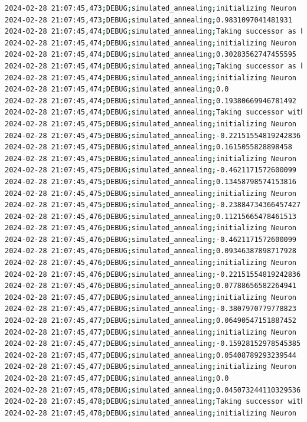 \documentclass{article}
\begin{document}
\begin{lstlisting}[language=bash, caption=Example Output of Program]
2024-02-28 21:07:45,473;DEBUG;simulated_annealing;initializing Neuron
2024-02-28 21:07:45,473;DEBUG;simulated_annealing;0.9831097041481931
2024-02-28 21:07:45,474;DEBUG;simulated_annealing;Taking successor as better option (exploitation)
2024-02-28 21:07:45,474;DEBUG;simulated_annealing;initializing Neuron
2024-02-28 21:07:45,474;DEBUG;simulated_annealing;0.30283562747455595
2024-02-28 21:07:45,474;DEBUG;simulated_annealing;Taking successor as better option (exploitation)
2024-02-28 21:07:45,474;DEBUG;simulated_annealing;initializing Neuron
2024-02-28 21:07:45,474;DEBUG;simulated_annealing;0.0
2024-02-28 21:07:45,474;DEBUG;simulated_annealing;0.19380669946781492
2024-02-28 21:07:45,474;DEBUG;simulated_annealing;Taking successor with probability 100% (exploration)
2024-02-28 21:07:45,475;DEBUG;simulated_annealing;initializing Neuron
2024-02-28 21:07:45,475;DEBUG;simulated_annealing;-0.22151554819242836
2024-02-28 21:07:45,475;DEBUG;simulated_annealing;0.1615055828898458
2024-02-28 21:07:45,475;DEBUG;simulated_annealing;initializing Neuron
2024-02-28 21:07:45,475;DEBUG;simulated_annealing;-0.4621171572600099
2024-02-28 21:07:45,475;DEBUG;simulated_annealing;0.13458798574153816
2024-02-28 21:07:45,475;DEBUG;simulated_annealing;initializing Neuron
2024-02-28 21:07:45,475;DEBUG;simulated_annealing;-0.23884734366457427
2024-02-28 21:07:45,476;DEBUG;simulated_annealing;0.11215665478461513
2024-02-28 21:07:45,476;DEBUG;simulated_annealing;initializing Neuron
2024-02-28 21:07:45,476;DEBUG;simulated_annealing;-0.4621171572600099
2024-02-28 21:07:45,476;DEBUG;simulated_annealing;0.09346387898717928
2024-02-28 21:07:45,476;DEBUG;simulated_annealing;initializing Neuron
2024-02-28 21:07:45,476;DEBUG;simulated_annealing;-0.22151554819242836
2024-02-28 21:07:45,476;DEBUG;simulated_annealing;0.07788656582264941
2024-02-28 21:07:45,477;DEBUG;simulated_annealing;initializing Neuron
2024-02-28 21:07:45,477;DEBUG;simulated_annealing;-0.3807970779778823
2024-02-28 21:07:45,477;DEBUG;simulated_annealing;0.06490547151887452
2024-02-28 21:07:45,477;DEBUG;simulated_annealing;initializing Neuron
2024-02-28 21:07:45,477;DEBUG;simulated_annealing;-0.15928152978545385
2024-02-28 21:07:45,477;DEBUG;simulated_annealing;0.05408789293239544
2024-02-28 21:07:45,477;DEBUG;simulated_annealing;initializing Neuron
2024-02-28 21:07:45,477;DEBUG;simulated_annealing;0.0
2024-02-28 21:07:45,478;DEBUG;simulated_annealing;0.045073244110329536
2024-02-28 21:07:45,478;DEBUG;simulated_annealing;Taking successor with probability 100% (exploration)
2024-02-28 21:07:45,478;DEBUG;simulated_annealing;initializing Neuron

\end{lstlisting}
\end{document}
